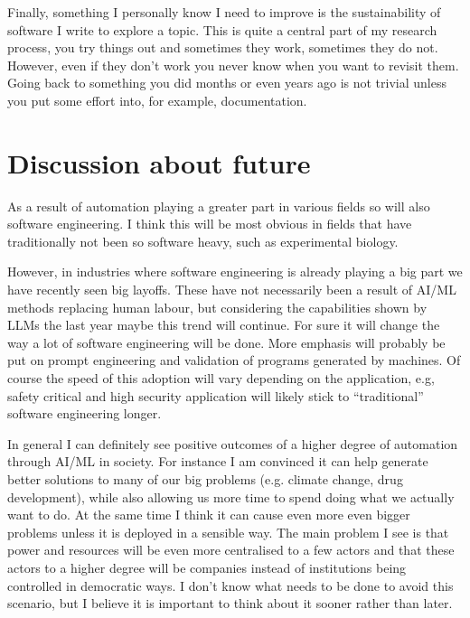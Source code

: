 \documentclass[11pt]{article}
\begin{document}
Finally, something I personally know I need to improve is the sustainability of software I write to explore a topic. This is quite a central part of my research process, you try things out and sometimes they work, sometimes they do not. However, even if they don't work you never know when you want to revisit them. Going back to something you did months or even years ago is not trivial unless you put some effort into, for example, documentation.



\section*{Discussion about future}
As a result of automation playing a greater part in various fields so will also software engineering. I think this will be most obvious in fields that have traditionally not been so software heavy, such as experimental biology.

However, in industries where software engineering is already playing a big part we have recently seen big layoffs. These have not necessarily been a result of AI/ML methods replacing human labour, but considering the capabilities shown by LLMs the last year maybe this trend will continue. For sure it will change the way a lot of software engineering will be done. More emphasis will probably be put on prompt engineering and validation of programs generated by machines. Of course the speed of this adoption will vary depending on the application, e.g, safety critical and high security application will likely stick to ``traditional'' software engineering longer.

In general I can definitely see positive outcomes of a higher degree of automation through AI/ML in society. For instance I am convinced it can help generate better solutions to many of our big problems (e.g. climate change, drug development), while also allowing us more time to spend doing what we actually want to do. At the same time I think it can cause even more even bigger problems unless it is deployed in a sensible way. The main problem I see is that power and resources will be even more centralised to a few actors and that these actors to a higher degree will be companies instead of institutions being controlled in democratic ways. I don't know what needs to be done to avoid this scenario, but I believe it is important to think about it sooner rather than later.
\end{document}
